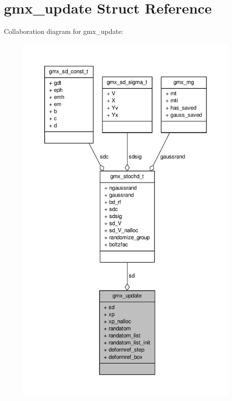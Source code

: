 \hypertarget{structgmx__update}{\section{gmx\-\_\-update \-Struct \-Reference}
\label{structgmx__update}
}


\-Collaboration diagram for gmx\-\_\-update\-:
\nopagebreak
\begin{figure}[H]
\begin{center}
\leavevmode
\includegraphics[height=550pt]{structgmx__update__coll__graph}
\end{center}
\end{figure}
